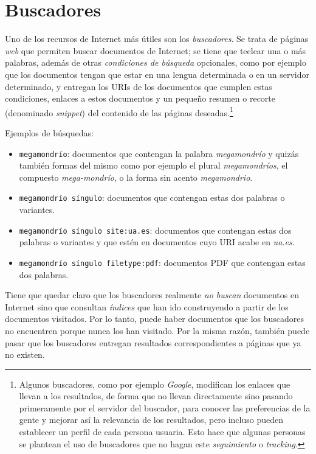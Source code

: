 \section{Buscadores} Uno de los recursos de Internet más útiles son los \emph{buscadores}. Se trata de páginas \emph{web} que permiten buscar documentos de Internet; se tiene que teclear una o más palabras, además de otras \emph{condiciones de búsqueda} opcionales, como por ejemplo que los documentos tengan que estar en una lengua determinada o en un servidor determinado, y entregan los URIs de los documentos que cumplen estas condiciones, enlaces a estos documentos y un pequeño resumen o recorte (denominado \emph{snippet}) del contenido de las páginas deseadas.\footnote{Algunos buscadores, como por ejemplo \emph{Google}, modifican los enlaces que llevan a los resultados, de forma que no llevan directamente sino pasando primeramente por el servidor del buscador, para conocer las preferencias de la gente y mejorar así la relevancia de los resultados, pero incluso pueden establecer un perfil de cada persona usuaria. Esto hace que algunas personas se plantean el uso de buscadores que no hagan este \emph{seguimiento} o \emph{tracking}.} 

Ejemplos de búsquedas: \begin{itemize} \item \texttt{megamondrío}: documentos que contengan la palabra \emph{megamondrío} y quizás también formas del mismo como por ejemplo el plural \emph{megamondríos}, el compuesto \emph{mega-mondrío}, o la forma sin acento \emph{megamondrio}. \item \texttt{megamondrío síngulo}: documentos que contengan estas dos palabras o variantes. \item \texttt{megamondrío síngulo site:ua.es}: documentos que contengan estas dos palabras o variantes y que estén en documentos cuyo URI acabe en \emph{ua.es}. \item \texttt{megamondrío síngulo filetype:pdf}: documentos PDF que contengan estas dos palabras. \end{itemize} 

Tiene que quedar claro que los buscadores realmente \emph{no buscan} documentos en Internet sino que consultan \emph{índices} que han ido construyendo a partir de los documentos visitados. Por lo tanto, puede haber documentos que los buscadores no encuentren porque nunca los han visitado. Por la misma razón, también puede pasar que los buscadores entregan resultados correspondientes a páginas que ya no existen. 

